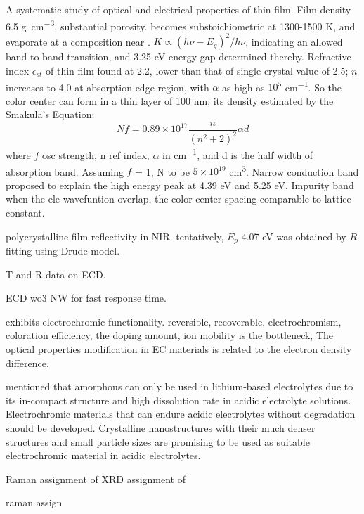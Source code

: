 A systematic study of optical and electrical properties of  thin film.\cite{Deb1973} Film density 6.5 \si{g\per cm^3}, substantial porosity.  becomes substoichiometric at 1300-1500 K, and evaporate at a composition near . $K \propto (h\nu - E_g)^2/h\nu$, indicating an allowed band to band transition, and 3.25 eV energy gap determined thereby. Refractive index $\epsilon_{st}$ of thin film  found at 2.2, lower than that of single crystal value of 2.5; $n$ increases to 4.0 at absorption edge region, with $\alpha$ as high as $10^5$ \si{cm^{-1}}. So the color center can form in a thin layer of 100 nm; its density estimated by the Smakula's Equation:
\[
Nf = 0.89\times10^17\frac{n}{(n^2+2)^2} \alpha d
\]
where $f$ osc strength, n ref index, $\alpha$ in \si{cm^{-1}}, and d is the half width of absorption band. Assuming $f$ = 1, N to be $5\times10^{19}$ \si{cm^3}. 
Narrow conduction band proposed to explain the high energy peak at 4.39 eV and 5.25 eV. Impurity band when the ele wavefuntion overlap, the color center spacing comparable to lattice constant. 


polycrystalline  film reflectivity in NIR.\cite{Goldner1983} tentatively,  $E_p$ 4.07 eV was obtained by $R$ fitting using Drude model. 

T and R data on ECD. \cite{OBrien1999}

ECD wo3 NW for fast response time. \cite{Liao2006a}


exhibits electrochromic functionality. reversible, recoverable, electrochromism, 
coloration efficiency, the doping amount, 
ion mobility is the bottleneck, 
The optical properties modification in EC materials is related to the electron density difference. 


\citeauthor{Wang2009a} mentioned that amorphous  can only be used in lithium-based electrolytes due to its in-compact structure and high dissolution rate in acidic electrolyte solutions. Electrochromic materials that can endure acidic electrolytes without degradation should be developed. Crystalline  nanostructures with their much denser structures and small particle sizes are promising to be used as suitable electrochromic material in acidic electrolytes.

Raman assignment of 
XRD assignment of 

raman assign

